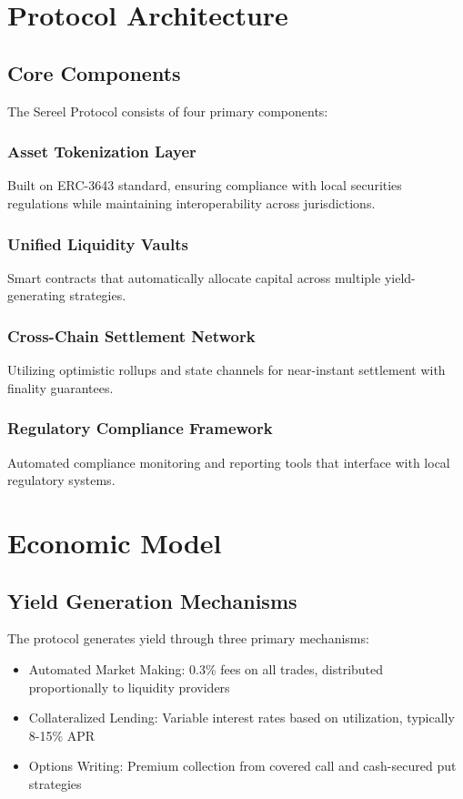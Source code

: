 \documentclass[12pt]{article}
\begin{document}
\section{Protocol Architecture}

\subsection{Core Components}

The Sereel Protocol consists of four primary components:

\subsubsection{Asset Tokenization Layer}
Built on ERC-3643 standard, ensuring compliance with local securities regulations while maintaining interoperability across jurisdictions.

\subsubsection{Unified Liquidity Vaults}
Smart contracts that automatically allocate capital across multiple yield-generating strategies.

\subsubsection{Cross-Chain Settlement Network}
Utilizing optimistic rollups and state channels for near-instant settlement with finality guarantees.

\subsubsection{Regulatory Compliance Framework}
Automated compliance monitoring and reporting tools that interface with local regulatory systems.

\section{Economic Model}

\subsection{Yield Generation Mechanisms}

The protocol generates yield through three primary mechanisms:

\begin{itemize}
  \item Automated Market Making: 0.3\% fees on all trades, distributed proportionally to liquidity providers
  \item Collateralized Lending: Variable interest rates based on utilization, typically 8-15\% APR
  \item Options Writing: Premium collection from covered call and cash-secured put strategies
\end{itemize}
\end{document}
